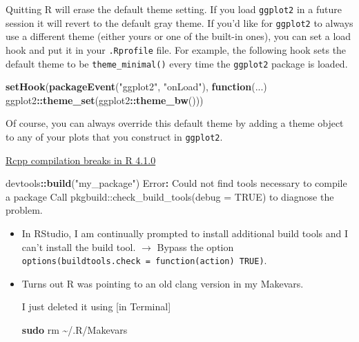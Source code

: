 \documentclass[
]{book}
\newenvironment{Shaded}{\begin{snugshade}}{\end{snugshade}}
\newcommand{\AttributeTok}[1]{\textcolor[rgb]{0.13,0.29,0.53}{#1}}
\newcommand{\ControlFlowTok}[1]{\textcolor[rgb]{0.13,0.29,0.53}{\textbf{#1}}}
\newcommand{\FunctionTok}[1]{\textcolor[rgb]{0.13,0.29,0.53}{\textbf{#1}}}
\newcommand{\NormalTok}[1]{#1}
\newcommand{\SpecialCharTok}[1]{\textcolor[rgb]{0.81,0.36,0.00}{\textbf{#1}}}
\newcommand{\StringTok}[1]{\textcolor[rgb]{0.31,0.60,0.02}{#1}}
\theoremstyle{definition}
\theoremstyle{definition}
\theoremstyle{definition}
\theoremstyle{definition}
\theoremstyle{remark}
\begin{document}
Quitting R will erase the default theme setting. If you load \texttt{ggplot2} in a future session it will revert to the default gray theme. If you'd like for \texttt{ggplot2} to always use a different theme (either yours or one of the built-in ones), you can set a load hook and put it in your \texttt{.Rprofile} file. For example, the following hook sets the default theme to be \texttt{theme\_minimal()} every time the \texttt{ggplot2} package is loaded.

\begin{Shaded}
\begin{Highlighting}[]
\FunctionTok{setHook}\NormalTok{(}\FunctionTok{packageEvent}\NormalTok{(}\StringTok{"ggplot2"}\NormalTok{, }\StringTok{"onLoad"}\NormalTok{), }
        \ControlFlowTok{function}\NormalTok{(...) ggplot2}\SpecialCharTok{::}\FunctionTok{theme\_set}\NormalTok{(ggplot2}\SpecialCharTok{::}\FunctionTok{theme\_bw}\NormalTok{()))}
\end{Highlighting}
\end{Shaded}

Of course, you can always override this default theme by adding a theme object to any of your plots that you construct in \texttt{ggplot2}.

\href{https://community.rstudio.com/t/rcpp-compilation-breaks-in-r-4-1-0-running-on-big-sur-11-4/109744}{Rcpp compilation breaks in R 4.1.0}

\begin{Shaded}
\begin{Highlighting}[]
\NormalTok{devtools}\SpecialCharTok{::}\FunctionTok{build}\NormalTok{(}\StringTok{"my\_package"}\NormalTok{)}
\NormalTok{Error}\SpecialCharTok{:}\NormalTok{ Could not find tools necessary to compile a package}
\NormalTok{Call }\StringTok{\textasciigrave{}}\AttributeTok{pkgbuild::check\_build\_tools(debug = TRUE)}\StringTok{\textasciigrave{}}\NormalTok{ to diagnose the problem.}
\end{Highlighting}
\end{Shaded}

\begin{itemize}
\item
  In RStudio, I am continually prompted to install additional build tools and I can't install the build tool. \(\rightarrow\) Bypass the option \texttt{options(buildtools.check\ =\ function(action)\ TRUE)}.
\item
  Turns out R was pointing to an old clang version in my Makevars.

  I just deleted it using {[}in Terminal{]}

\begin{Shaded}
\begin{Highlighting}[]
\FunctionTok{sudo}\NormalTok{ rm \textasciitilde{}/.R/Makevars}
\end{Highlighting}
\end{Shaded}
\end{itemize}
\end{document}

